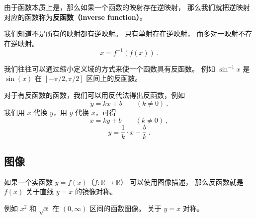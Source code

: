 
\begin{issues}
\issueDraft
\end{issues}

由于函数本质上是，那么如果一个函数的映射存在逆映射， 那么我们就把逆映射对应的函数称为\textbf{反函数（inverse function）}。

我们知道不是所有的映射都有逆映射。 只有单射存在逆映射， 而多对一映射不存在逆映射。
\begin{equation}
x = f^{-1}(f(x))~.
\end{equation}


我们往往可以通过缩小定义域的方式来使一个函数具有反函数。 例如 $\sin^{-1} x$ 是 $\sin(x)$ 在 $[-\pi/2, \pi/2]$ 区间上的反函数。

对于有反函数的函数，我们可以用反代法得出反函数，例如
\begin{equation}
y = kx + b \qquad (k \ne 0)~.
\end{equation}
我们用 $x$ 代换 $y$，用 $y$ 代换 $x$，可得
\begin{equation}
x = ky + b \qquad (k \ne 0)~,
\end{equation}
\begin{equation}
y = \frac{1}{k} \cdot x - \frac{b}{k}~.
\end{equation}

\subsection{图像}
如果一个实函数 $y = f(x)$（$f: \mathbb R \to \mathbb R$） 可以使用图像描述， 那么反函数就是 $f(x)$ 关于直线 $y = x$ 的镜像对称。

例如 $x^2$ 和 $\sqrt{x}$ 在 $(0, \infty)$ 区间的函数图像。 关于 $y = x$ 对称。
